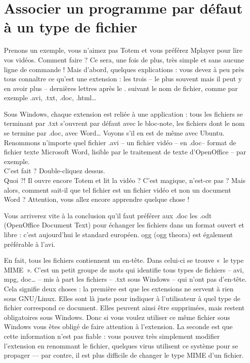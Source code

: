 \section{Associer un programme par défaut à un type de fichier}
\label{RefAssoceFichierApplication}
Prenons un exemple, vous n'aimez pas Totem et vous préférez Mplayer pour lire vos vidéos. Comment faire ? Ce sera, une fois de plus, très simple et sans aucune ligne de commande ! Mais d'abord, quelques explications : vous devez à peu près tous connaître ce qu'est une extension : les trois -- le plus souvent mais il peut y en avoir plus -- dernières lettres après le . suivant le nom de fichier, comme par exemple .avi, .txt, .doc, .html\ldots{}\par
Sous Windows, chaque extension est reliée à une application : tous les fichiers se terminant par .txt s'ouvrent par défaut avec le bloc-note, les fichiers dont le nom se termine par .doc, avec Word\ldots{} Voyons s'il en est de même avec Ubuntu. Renommons n'importe quel fichier .avi -- un fichier vidéo -- en .doc-- format de fichier texte Microsoft Word, lisible par le traitement de texte d'OpenOffice -- par exemple.\\
C'est fait ? Double-cliquez dessus.\\
Quoi ?! Il ouvre encore Totem et lit la vidéo ? C'est magique, n'est-ce pas ? Mais alors, comment sait-il que tel fichier est un fichier vidéo et non un document Word ? Attention, vous allez encore apprendre quelque chose !\par
\begin{nota}
Vous arriverez vite à la conclusion qu'il faut préférer aux .doc les .odt (OpenOffice Document Text) pour échanger les fichiers dans un format ouvert et libre : c'est aujourd'hui le standard européen. ogg (ogg theora) est également préférable à l'avi.
\end{nota}
En fait, tous les fichiers contiennent un en-tête. Dans celui-ci se trouve «~le type MIME~». C'est un petit groupe de mots qui identifie tous types de fichiers -- avi, mpg, doc\ldots{} -- mis à part les fichiers  -- .txt sous Windows -- qui n'ont pas d'en-tête. Cela signifie deux choses : la première est que les extensions ne servent à rien sous GNU/Linux. Elles sont là juste pour indiquer à l'utilisateur à quel type de fichier correspond ce document. Elles peuvent ainsi être supprimées, mais restent obligatoires sous Windows. Donc si vous voulez utiliser ce même fichier sous Windows vous êtes obligé de faire attention à l'extension. La seconde est que cette information n'est pas fiable : vous pouvez très simplement modifier l'extension en renommant le fichier, quelques virus utilisent ce système pour se propager --- par contre, il est plus difficile de changer le type MIME d'un fichier.\par

